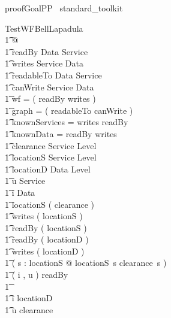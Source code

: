 \begin{zsection}	 \SECTION proofGoalPP \parents~standard\_toolkit
\end{zsection}

 

\begin{theorem}{ Test}\forall WFBellLapadula \\
    \t1 @ \\
    \t1 readBy \in Data \rel Service \land \\
      \t1 writes \in Service \rel Data \land \\
      \t1 readableTo \in Data \rel Service \land \\
      \t1 canWrite \in Service \rel Data \land \\
      \t1 wf = ( readBy \comp writes ) \plus \land \\
      \t1 graph = ( readableTo \comp canWrite ) \plus \land \\
      \t1 knownServices = \dom writes \cup \ran readBy \land \\
      \t1 knownData = \dom readBy \cup \ran writes \land \\
      \t1 clearance \in Service \pfun Level \land \\
      \t1 locationS \in Service \pfun Level \land \\
      \t1 locationD \in Data \pfun Level \land \\
      \t1 u \in Service \land \\
      \t1 i \in Data \land \\
      \t1 \dom locationS \in \power ( \dom clearance ) \land \\
      \t1 \dom writes \in \power ( \dom locationS ) \land \\
      \t1 \ran readBy \in \power ( \dom locationS ) \land \\
      \t1 \dom readBy \in \power ( \dom locationD ) \land \\
      \t1 \ran writes \in \power ( \dom locationD ) \land \\
      \t1 ( \forall s : \dom locationS @ locationS~s \leq clearance~s ) \land \\
      \t1 ( i , u ) \in readBy \\
     \t1 \implies \\
     \t1 i \in \dom locationD \land \\
      \t1 u \in \dom clearance
\end{theorem}

 
